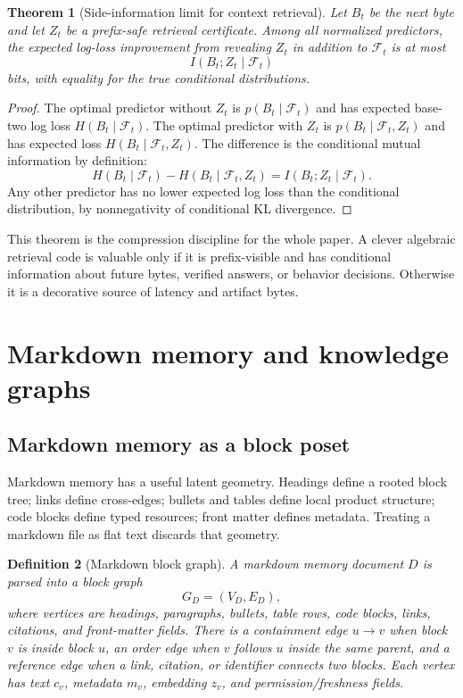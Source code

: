 \documentclass[11pt]{article}
\newtheorem{theorem}{Theorem}[section]
\newtheorem{definition}[theorem]{Definition}
\numberwithin{equation}{section}
\begin{document}
\begin{theorem}[Side-information limit for context retrieval]
Let $B_t$ be the next byte and let $Z_t$ be a prefix-safe retrieval certificate. Among all normalized predictors, the expected log-loss improvement from revealing $Z_t$ in addition to $\mathcal{F}_t$ is at most
\begin{equation}
 I(B_t;Z_t\mid \mathcal{F}_t)
\end{equation}
bits, with equality for the true conditional distributions.
\end{theorem}
\begin{proof}
The optimal predictor without $Z_t$ is $p(B_t\mid\mathcal{F}_t)$ and has expected base-two log loss $H(B_t\mid\mathcal{F}_t)$. The optimal predictor with $Z_t$ is $p(B_t\mid\mathcal{F}_t,Z_t)$ and has expected loss $H(B_t\mid\mathcal{F}_t,Z_t)$. The difference is the conditional mutual information by definition:
\begin{equation}
H(B_t\mid\mathcal{F}_t)-H(B_t\mid\mathcal{F}_t,Z_t)=I(B_t;Z_t\mid\mathcal{F}_t).
\end{equation}
Any other predictor has no lower expected log loss than the conditional distribution, by nonnegativity of conditional KL divergence.
\end{proof}

This theorem is the compression discipline for the whole paper. A clever algebraic retrieval code is valuable only if it is prefix-visible and has conditional information about future bytes, verified answers, or behavior decisions. Otherwise it is a decorative source of latency and artifact bytes.

\section{Markdown memory and knowledge graphs}
\subsection{Markdown memory as a block poset}
Markdown memory has a useful latent geometry. Headings define a rooted block tree; links define cross-edges; bullets and tables define local product structure; code blocks define typed resources; front matter defines metadata. Treating a markdown file as flat text discards that geometry.

\begin{definition}[Markdown block graph]
A markdown memory document $D$ is parsed into a block graph
\begin{equation}
G_D=(V_D,E_D),
\end{equation}
where vertices are headings, paragraphs, bullets, table rows, code blocks, links, citations, and front-matter fields. There is a containment edge $u\to v$ when block $v$ is inside block $u$, an order edge when $v$ follows $u$ inside the same parent, and a reference edge when a link, citation, or identifier connects two blocks. Each vertex has text $c_v$, metadata $m_v$, embedding $z_v$, and permission/freshness fields.
\end{definition}
\end{document}

